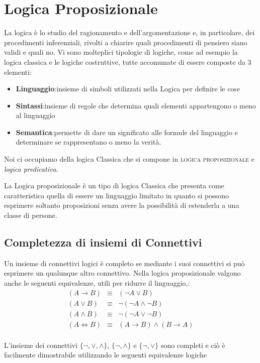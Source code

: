 \chapter{Logica Proposizionale}
La logica è lo studio del ragionamento e dell’argomentazione e, in particolare,
dei	procedimenti inferenziali, rivolti a chiarire quali	procedimenti di pensiero siano validi e quali no.
Vi sono molteplici tipologie di logiche, come ad esempio la logica classica e le logiche costruttive,
tutte accomunate di essere composte da 3 elementi:

\begin{itemize}
  \item \textbf{Linguaggio}:insieme di simboli utilizzati nella Logica per definire le cose
  \item \textbf{Sintassi}:insieme di regole che determina quali elementi appartengono o meno al linguaggio
  \item \textbf{Semantica}:permette di dare un significato alle formule del linguaggio e determinare
        se rappresentano o meno la verità.
\end{itemize}

Noi ci occupiamo della logica Classica che si compone in \textsc{logica proposizionale} e
\textit{logica predicativa}.

La Logica proposizionale è un tipo di logica Classica che presenta come caratteristica quella
di essere un linguaggio limitato in quanto si possono esprimere soltanto proposizioni senza
avere la possibilità di estenderla a una classe di persone.









\section{Completezza di insiemi di Connettivi}
Un insieme di connettivi logici è completo se mediante i suoi connettivi si può
esprimere un qualunque altro connettivo.
Nella logica proposizionale valgono anche le seguenti equivalenze, utili per ridurre il linguaggio,:
\begin{align*}
    (A \rightarrow B) & \equiv & (\neg A \lor B) \\
    (A \lor B) & \equiv & \neg(\neg A \land \neg B) \\
    (A \land B) & \equiv & \neg(\neg A \lor \neg B) \\
    (A \iff B) & \equiv & (A \rightarrow B) \land (B \rightarrow A) \\
\end{align*}

L'insieme dei connettivi $\{ \neg,\lor,\land \}$, $\{ \neg,\land \}$ e $\{ \neg,\lor \}$ sono completi
e ciò è facilmente dimostrabile utilizzando le seguenti equivalenze logiche
